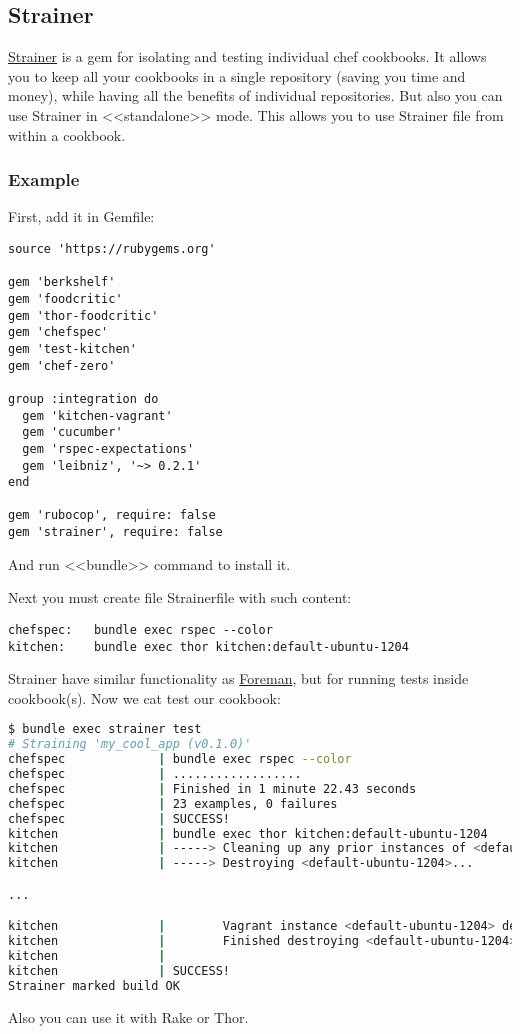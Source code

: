 \subsection{Strainer}

\href{https://github.com/customink/strainer}{Strainer} is a gem for isolating and testing individual chef cookbooks. It allows you to keep all your cookbooks in a single repository (saving you time and money), while having all the benefits of individual repositories. But also you can use Strainer in <<standalone>> mode. This allows you to use Strainer file from within a cookbook.

\subsubsection{Example}

First, add it in Gemfile:

\begin{lstlisting}[label=lst:testing-strainer1]
source 'https://rubygems.org'

gem 'berkshelf'
gem 'foodcritic'
gem 'thor-foodcritic'
gem 'chefspec'
gem 'test-kitchen'
gem 'chef-zero'

group :integration do
  gem 'kitchen-vagrant'
  gem 'cucumber'
  gem 'rspec-expectations'
  gem 'leibniz', '~> 0.2.1'
end

gem 'rubocop', require: false
gem 'strainer', require: false
\end{lstlisting}

And run <<bundle>> command to install it.

Next you must create file Strainerfile with such content:

\begin{lstlisting}[label=lst:testing-strainer2]
chefspec:   bundle exec rspec --color
kitchen:    bundle exec thor kitchen:default-ubuntu-1204
\end{lstlisting}

Strainer have similar functionality as \href{http://ddollar.github.io/foreman/}{Foreman}, but for running tests inside cookbook(s). Now we cat test our cookbook:

\begin{lstlisting}[language=Bash,label=lst:testing-strainer3]
$ bundle exec strainer test
# Straining 'my_cool_app (v0.1.0)'
chefspec             | bundle exec rspec --color
chefspec             | ..................
chefspec             | Finished in 1 minute 22.43 seconds
chefspec             | 23 examples, 0 failures
chefspec             | SUCCESS!
kitchen              | bundle exec thor kitchen:default-ubuntu-1204
kitchen              | -----> Cleaning up any prior instances of <default-ubuntu-1204>
kitchen              | -----> Destroying <default-ubuntu-1204>...

...

kitchen              |        Vagrant instance <default-ubuntu-1204> destroyed.
kitchen              |        Finished destroying <default-ubuntu-1204> (0m6.87s).
kitchen              |
kitchen              | SUCCESS!
Strainer marked build OK
\end{lstlisting}

Also you can use it with Rake or Thor.